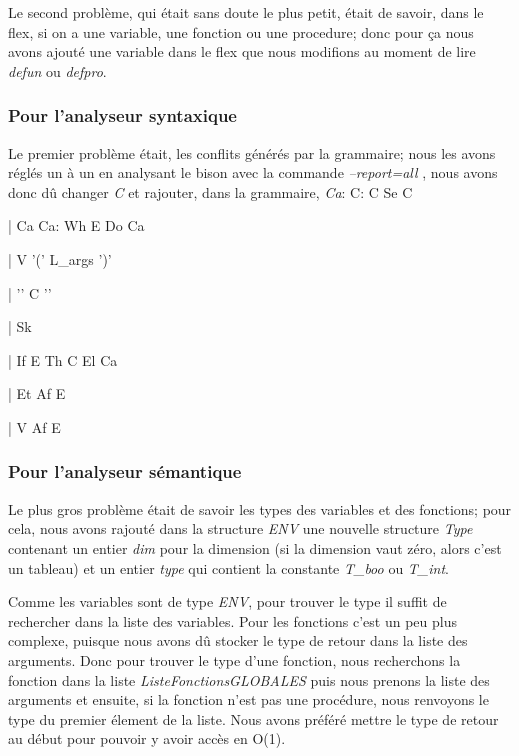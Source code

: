 \documentclass[10pt,a4paper]{article}
\begin{document}
Le second problème, qui était sans doute le plus petit, était de savoir, dans le flex, si on a une variable, une fonction ou une procedure; donc pour ça nous avons ajouté une variable dans le flex que nous modifions au moment de lire \textit{defun} ou \textit{defpro}.

\subsubsection{Pour l'analyseur syntaxique}
Le premier problème était, les conflits générés par la grammaire; nous les avons réglés un à un en analysant le bison avec la commande \textit{--report=all} , nous avons donc dû changer \textit{C} et rajouter, dans la grammaire, \textit{Ca}:\newline 
C: C Se C
    
| Ca\newline\newline
Ca: Wh E Do Ca

| V '(' L\_args ')'
    
| '{' C '}'
    
| Sk
    
| If E Th C El Ca
    
| Et Af E

| V Af E



\subsubsection {Pour l'analyseur sémantique}
Le plus gros problème était de savoir les types des variables et des fonctions; pour cela, nous avons rajouté dans la structure \textit{ENV} une nouvelle structure \textit{Type} contenant un entier \textit{dim} pour la dimension (si la dimension vaut zéro, alors c'est un tableau) et un entier \textit{type} qui contient la constante \textit{T\_boo} ou \textit{T\_int}.

Comme les variables sont de type \textit{ENV}, pour trouver le type il suffit de rechercher dans la liste des variables. Pour les fonctions c'est un peu plus complexe, puisque nous avons dû stocker le type de retour dans la liste des arguments. Donc pour trouver le type d'une fonction, nous recherchons la fonction dans la liste \textit{ListeFonctionsGLOBALES} puis nous prenons la liste des arguments et ensuite, si la fonction n'est pas une procédure, nous renvoyons le type du premier élement de la liste. Nous avons préféré mettre le type de retour au début pour pouvoir y avoir accès en O(1).
\end{document}
